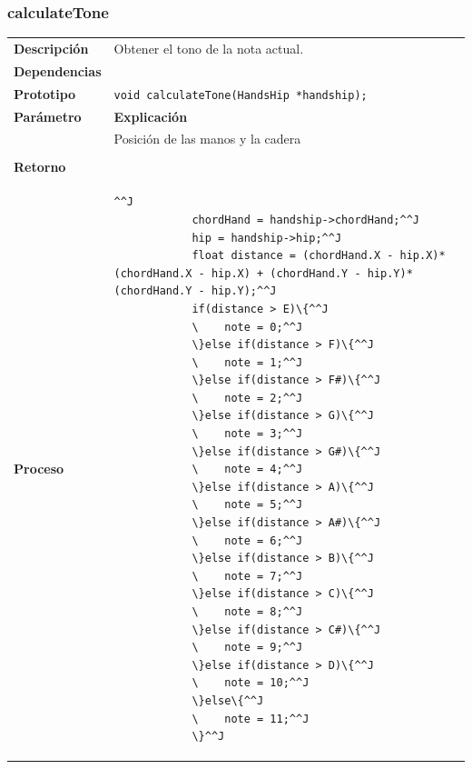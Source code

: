 \documentclass[a4paper,10pt]{article}
\begin{document}
\subsubsection{calculateTone}
\begin{tabularx}{\textwidth}{p{25mm} X}
        \textbf{Descripción} & Obtener el tono de la nota actual. \\
        \textbf{Dependencias} & \\
        \textbf{Prototipo} & \lstinline{void calculateTone(HandsHip *handship);}\\
        \textbf{Parámetro} & \textbf{Explicación} \\
        \begin{tabular}{p{2cm} l}
                handsHip & Posición de las manos y la cadera \\
        \end{tabular}\\

        \textbf{Retorno} & \\
        \textbf{Proceso} & 
               \begin{lstlisting}[breaklines=true]^^J
            chordHand = handship->chordHand;^^J
            hip = handship->hip;^^J
            float distance = (chordHand.X - hip.X)*(chordHand.X - hip.X) + (chordHand.Y - hip.Y)*(chordHand.Y - hip.Y);^^J
            if(distance > E)\{^^J
            \    note = 0;^^J
            \}else if(distance > F)\{^^J
            \    note = 1;^^J
            \}else if(distance > F#)\{^^J
            \    note = 2;^^J
            \}else if(distance > G)\{^^J
            \    note = 3;^^J
            \}else if(distance > G#)\{^^J
            \    note = 4;^^J
            \}else if(distance > A)\{^^J
            \    note = 5;^^J
            \}else if(distance > A#)\{^^J
            \    note = 6;^^J
            \}else if(distance > B)\{^^J
            \    note = 7;^^J
            \}else if(distance > C)\{^^J
            \    note = 8;^^J
            \}else if(distance > C#)\{^^J
            \    note = 9;^^J
            \}else if(distance > D)\{^^J
            \    note = 10;^^J
            \}else\{^^J
            \    note = 11;^^J
            \}^^J
        \end{lstlisting} 
 \\
\end{tabularx}
\end{document}
